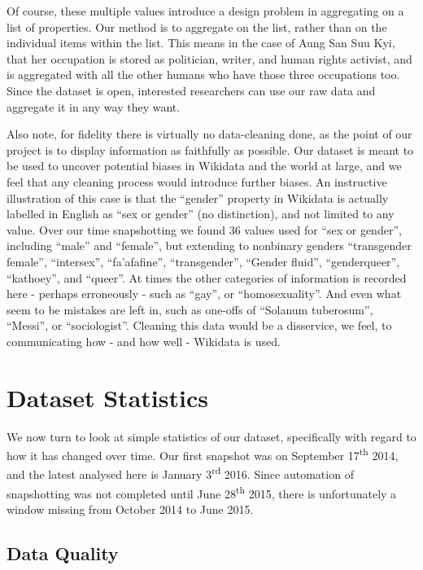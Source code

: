 \documentclass[letterpaper]{article}
\begin{document}
Of course, these multiple values introduce a design problem in aggregating on a list of properties. Our method is to aggregate on the list, rather than on the individual items within the list. This means in the case of Aung San Suu Kyi, that her occupation is stored as politician, writer, and human rights activist, and is aggregated with all the other humans who have those three occupations too. Since the dataset is open, interested researchers can use our raw data and aggregate it in any way they want.

Also note, for fidelity there is virtually no data-cleaning done, as the point of our project is to display information as faithfully as possible. Our dataset is meant to be used to uncover potential biases in Wikidata and the world at large, and we feel that any cleaning process would introduce further biases. An instructive illustration of this case is that the ``gender'' property in Wikidata is actually labelled in English  as ``sex or gender'' (no distinction), and not limited to any value. Over our time snapshotting we found 36 values used for ``sex or gender'', including ``male'' and ``female'', but extending to nonbinary genders ``transgender female'', ``intersex'', ``fa'afafine'', ``transgender'', ``Gender fluid'',  ``genderqueer'', ``kathoey'', and ``queer''. At times the other categories of information is recorded here - perhaps erroneously - such as ``gay'', or ``homosexuality''. And even what seem to be mistakes are left in, such as one-offs of ``Solanum tuberosum'', ``Messi'', or ``sociologist''. Cleaning this data would be a disservice, we feel, to communicating how - and how well - Wikidata is used.

\section{Dataset Statistics}
We now turn to look at simple statistics of our dataset, specifically with regard to how it has changed over time. Our first snapshot was on September 17\textsuperscript{th} 2014, and the latest analysed here is January 3\textsuperscript{rd} 2016. Since automation of snapshotting was not completed until June 28\textsuperscript{th} 2015, there is unfortunately a window missing from October 2014 to June 2015.

\subsection{Data Quality}
\end{document}
